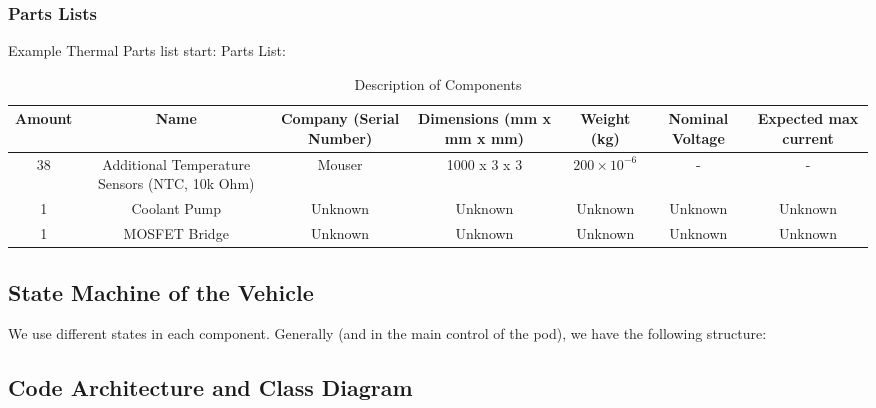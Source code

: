 \subsubsection{Parts Lists}
Example Thermal Parts list start:
Parts List:
\begin{table}[h]
    \centering
    \begin{tabular}{|c|c|c|c|c|c|c|}
    \hline
    \textbf{Amount} & \textbf{Name} & \textbf{Company (Serial Number)} & \textbf{Dimensions (mm x mm x mm)} & \textbf{Weight (kg)} & \textbf{Nominal Voltage} & \textbf{Expected max current} \\
    \hline
    38 & Additional Temperature Sensors (NTC, 10k Ohm) & Mouser & 1000 x 3 x 3 & $200 \times 10^{-6}$ & - & - \\
    \hline
    1 & Coolant Pump & Unknown & Unknown & Unknown & Unknown & Unknown \\
    \hline
    1 & MOSFET Bridge & Unknown & Unknown & Unknown & Unknown & Unknown \\
    \hline
    \end{tabular}
    \caption{Description of Components}
    \label{tab:components}
\end{table}
    

\subsection{State Machine of the Vehicle}

We use different states in each component. Generally (and in the main control of the pod), we have the following structure:

\subsection{Code Architecture and Class Diagram}

